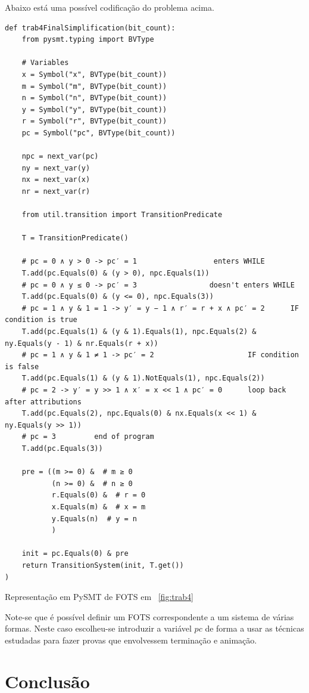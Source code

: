 \documentclass[11pt,a4paper]{report}%
\newenvironment{code}{\captionsetup{type=listing}}{}
\begin{document}
Abaixo está uma possível codificação do problema acima.

\begin{code}
\begin{verbatim}
def trab4FinalSimplification(bit_count):
    from pysmt.typing import BVType

    # Variables
    x = Symbol("x", BVType(bit_count))
    m = Symbol("m", BVType(bit_count))
    n = Symbol("n", BVType(bit_count))
    y = Symbol("y", BVType(bit_count))
    r = Symbol("r", BVType(bit_count))
    pc = Symbol("pc", BVType(bit_count))

    npc = next_var(pc)
    ny = next_var(y)
    nx = next_var(x)
    nr = next_var(r)

    from util.transition import TransitionPredicate

    T = TransitionPredicate()

    # pc = 0 ∧ y > 0 -> pc′ = 1                  enters WHILE
    T.add(pc.Equals(0) & (y > 0), npc.Equals(1))
    # pc = 0 ∧ y ≤ 0 -> pc′ = 3                 doesn't enters WHILE
    T.add(pc.Equals(0) & (y <= 0), npc.Equals(3))
    # pc = 1 ∧ y & 1 = 1 -> y′ = y − 1 ∧ r′ = r + x ∧ pc′ = 2      IF condition is true
    T.add(pc.Equals(1) & (y & 1).Equals(1), npc.Equals(2) & ny.Equals(y - 1) & nr.Equals(r + x))
    # pc = 1 ∧ y & 1 ≠ 1 -> pc′ = 2                      IF condition is false
    T.add(pc.Equals(1) & (y & 1).NotEquals(1), npc.Equals(2))
    # pc = 2 -> y′ = y >> 1 ∧ x′ = x << 1 ∧ pc′ = 0      loop back after attributions
    T.add(pc.Equals(2), npc.Equals(0) & nx.Equals(x << 1) & ny.Equals(y >> 1))
    # pc = 3         end of program
    T.add(pc.Equals(3))

    pre = ((m >= 0) &  # m ≥ 0
           (n >= 0) &  # n ≥ 0
           r.Equals(0) &  # r = 0
           x.Equals(m) &  # x = m
           y.Equals(n)  # y = n
           )

    init = pc.Equals(0) & pre
    return TransitionSystem(init, T.get())
)
\end{verbatim}
\caption{Representação em PySMT de FOTS em ~\ref{fig:trab4}}
\label{code:trab4_fots}
\end{code}

Note-se que é possível definir um FOTS correspondente a um sistema de várias formas.
Neste caso escolheu-se introduzir a variável $pc$ de forma a usar as técnicas estudadas
para fazer provas que envolvessem terminação e animação.

\chapter{Conclusão} \label{chap:concl}
\end{document}
